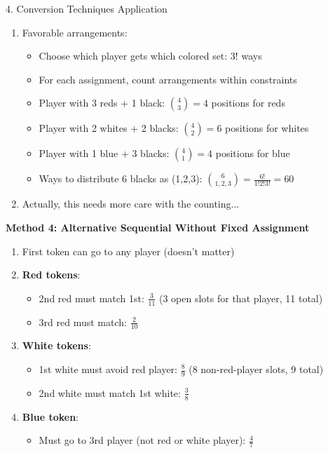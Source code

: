 \documentclass[12pt]{article}
\begin{document}
\begin{conversionbox}{4. Conversion Techniques Application}
\begin{enumerate}
    \item Favorable arrangements:
    \begin{itemize}
        \item Choose which player gets which colored set: $3!$ ways
        \item For each assignment, count arrangements within constraints
        \item Player with 3 reds + 1 black: $\binom{4}{3} = 4$ positions for reds
        \item Player with 2 whites + 2 blacks: $\binom{4}{2} = 6$ positions for whites
        \item Player with 1 blue + 3 blacks: $\binom{4}{1} = 4$ positions for blue
        \item Ways to distribute 6 blacks as (1,2,3): $\binom{6}{1,2,3} = \frac{6!}{1!2!3!} = 60$
    \end{itemize}
    
    \item Actually, this needs more care with the counting...
\end{enumerate}

\textbf{Method 4: Alternative Sequential Without Fixed Assignment}

\begin{enumerate}
    \item First token can go to any player (doesn't matter)
    
    \item \textbf{Red tokens}:
    \begin{itemize}
        \item 2nd red must match 1st: $\frac{3}{11}$ (3 open slots for that player, 11 total)
        \item 3rd red must match: $\frac{2}{10}$
    \end{itemize}
    
    \item \textbf{White tokens}:
    \begin{itemize}
        \item 1st white must avoid red player: $\frac{8}{9}$ (8 non-red-player slots, 9 total)
        \item 2nd white must match 1st white: $\frac{3}{8}$
    \end{itemize}
    
    \item \textbf{Blue token}:
    \begin{itemize}
        \item Must go to 3rd player (not red or white player): $\frac{4}{7}$
    \end{itemize}
    

\end{enumerate}
\end{conversionbox}
\end{document}
